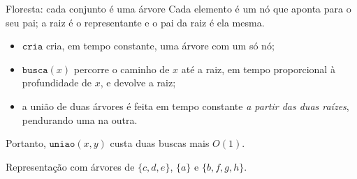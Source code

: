 \documentclass[aspectratio=169,10pt]{beamer}
\newcommand{\Cria}{\mathtt{cria}}
\newcommand{\Busca}{\mathtt{busca}}
\newcommand{\Uniao}{\mathtt{uniao}}
\begin{document}
% 
% 
\begin{frame}[t]{Floresta: cada conjunto é uma árvore}
  Cada elemento é um nó que aponta para o seu pai; a raiz é o
  representante e o pai da raiz é ela mesma.
  \begin{itemize}
  \item $\Cria$ cria, em tempo constante, uma árvore com um só nó;
  \item $\Busca(x)$ percorre o caminho de $x$ até a raiz, em tempo
    proporcional à profundidade de $x$, e devolve a raiz;
  \item a união de duas árvores é feita em tempo constante \textit{a
      partir das duas raízes}, pendurando uma na outra.
  \end{itemize}
  Portanto, $\Uniao(x,y)$ custa duas buscas mais $O(1)$.

  \medskip
  \centering

  {\footnotesize Representação com árvores de $\{c,d,e\}$, $\{a\}$ e
    $\{b,f,g,h\}$.}
\end{frame}
\end{document}
